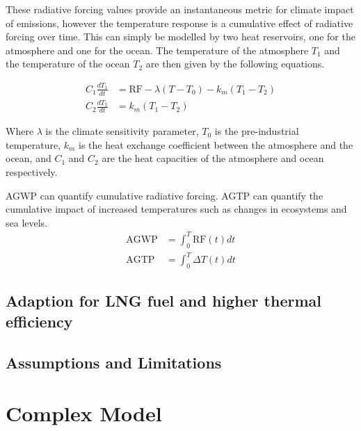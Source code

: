 \documentclass{article}
\begin{document}
These radiative forcing values provide an instantaneous metric for climate impact of emissions, however
the temperature response is a cumulative effect of radiative forcing over time.
This can simply be modelled by two heat reservoirs, one for the atmosphere and one for the ocean.
The temperature of the atmosphere $T_1$ and the temperature of the ocean $T_2$ are then given by the following equations.

\begin{align}
    C_1 \frac{dT_1}{dt} &= \text{RF} - \lambda(T - T_0) - k_m(T_1 - T_2) \\
    C_2 \frac{dT_2}{dt} &= k_m(T_1 - T_2)
\end{align}

Where $\lambda$ is the climate sensitivity parameter, $T_0$ is the pre-industrial temperature, $k_m$ is the heat exchange coefficient between the atmosphere and the ocean, and $C_1$ and $C_2$ are the heat capacities of the atmosphere and ocean respectively.

AGWP can quantify cumulative radiative forcing.
AGTP can quantify the cumulative impact of increased temperatures such as changes in ecosystems and sea levels.
\begin{align}
    \text{AGWP} &= \int_0^T \text{RF}(t) dt \\
    \text{AGTP} &= \int_0^T \Delta T(t) dt
\end{align}

\subsection{Adaption for LNG fuel and higher thermal efficiency}

\subsection{Assumptions and Limitations}



\section{Complex Model}


\end{document}
